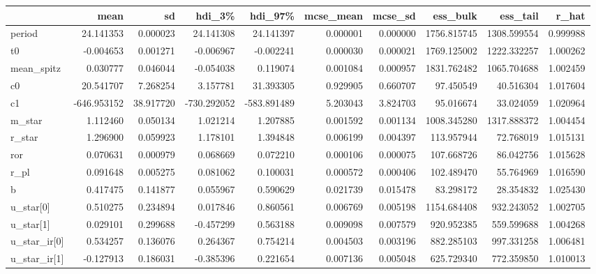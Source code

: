 \begin{tabular}{lrrrrrrrrr}
\toprule
{} &        mean &         sd &      hdi\_3\% &     hdi\_97\% &  mcse\_mean &   mcse\_sd &     ess\_bulk &     ess\_tail &     r\_hat \\
\midrule
period        &   24.141353 &   0.000023 &   24.141308 &   24.141397 &   0.000001 &  0.000000 &  1756.815745 &  1308.599554 &  0.999988 \\
t0            &   -0.004653 &   0.001271 &   -0.006967 &   -0.002241 &   0.000030 &  0.000021 &  1769.125002 &  1222.332257 &  1.000262 \\
mean\_spitz    &    0.030777 &   0.046044 &   -0.054038 &    0.119074 &   0.001084 &  0.000957 &  1831.762482 &  1065.704688 &  1.002459 \\
c0            &   20.541707 &   7.268254 &    3.157781 &   31.393305 &   0.929905 &  0.660707 &    97.450549 &    40.516304 &  1.017604 \\
c1            & -646.953152 &  38.917720 & -730.292052 & -583.891489 &   5.203043 &  3.824703 &    95.016674 &    33.024059 &  1.020964 \\
m\_star        &    1.112460 &   0.050134 &    1.021214 &    1.207885 &   0.001592 &  0.001134 &  1008.345280 &  1317.888372 &  1.004454 \\
r\_star        &    1.296900 &   0.059923 &    1.178101 &    1.394848 &   0.006199 &  0.004397 &   113.957944 &    72.768019 &  1.015131 \\
ror           &    0.070631 &   0.000979 &    0.068669 &    0.072210 &   0.000106 &  0.000075 &   107.668726 &    86.042756 &  1.015628 \\
r\_pl          &    0.091648 &   0.005275 &    0.081062 &    0.100031 &   0.000572 &  0.000406 &   102.489470 &    55.764969 &  1.016590 \\
b             &    0.417475 &   0.141877 &    0.055967 &    0.590629 &   0.021739 &  0.015478 &    83.298172 &    28.354832 &  1.025430 \\
u\_star[0]     &    0.510275 &   0.234894 &    0.017846 &    0.860561 &   0.006769 &  0.005198 &  1154.684408 &   932.243052 &  1.002705 \\
u\_star[1]     &    0.029101 &   0.299688 &   -0.457299 &    0.563188 &   0.009098 &  0.007579 &   920.952385 &   559.599688 &  1.004268 \\
u\_star\_ir[0]  &    0.534257 &   0.136076 &    0.264367 &    0.754214 &   0.004503 &  0.003196 &   882.285103 &   997.331258 &  1.006481 \\
u\_star\_ir[1]  &   -0.127913 &   0.186031 &   -0.385396 &    0.221654 &   0.007136 &  0.005048 &   625.729340 &   772.359850 &  1.010013 \\

\end{tabular}
